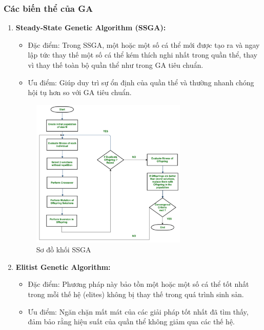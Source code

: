 \documentclass[14pt]{article}
\begin{document}
	\subsubsection{Các biến thể của GA}
	\newpage
	\begin{enumerate}
		\item \textbf{Steady-State Genetic Algorithm (SSGA):}
		\begin{itemize}
			\item Đặc điểm: Trong SSGA, một hoặc một số cá thể mới được tạo ra và ngay lập tức thay thế một số cá thể kém thích nghi nhất trong quần thể, thay vì thay thế toàn bộ quần thể như trong GA tiêu chuẩn.
			\item Ưu điểm: Giúp duy trì sự ổn định của quần thể và thường nhanh chóng hội tụ hơn so với GA tiêu chuẩn.
		\end{itemize}
		\begin{figure}[htbp]
			\centering
			\includegraphics[width=0.7\textwidth]{./Image/sơ đồ khối SSGA.png}
			\caption{Sơ đồ khối SSGA}
			\label{fig:mylabel}
		\end{figure}
		\newpage
		\item \textbf{Elitist Genetic Algorithm:}
		\begin{itemize}
			\item Đặc điểm: Phương pháp này bảo tồn một hoặc một số cá thể tốt nhất trong mỗi thế hệ (elites) không bị thay thế trong quá trình sinh sản.
			\item Ưu điểm: Ngăn chặn mất mát của các giải pháp tốt nhất đã tìm thấy, đảm bảo rằng hiệu suất của quần thể không giảm qua các thế hệ.
		\end{itemize}
	

\end{enumerate}
\end{document}
